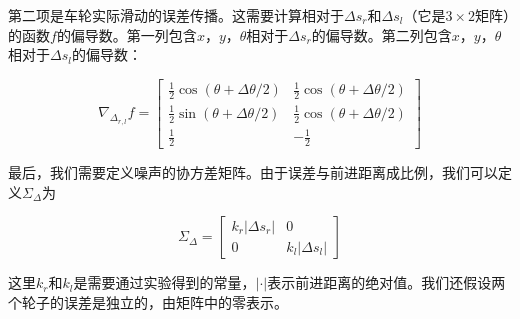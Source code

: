 
第二项是车轮实际滑动的误差传播。这需要计算相对于$\Delta s_r$和$\Delta s_l$（它是$3\times 2$矩阵）的函数$f$的偏导数。第一列包含$x$，$y$，$\theta$相对于$\Delta s_r$的偏导数。第二列包含$x$，$y$，$\theta$相对于$\Delta s_l$的偏导数：

\begin{equation}
\nabla_{\Delta_{r,l}} f=\left[
\begin{array}{cc}
\frac{1}{2}\cos(\theta+\Delta \theta/2) & \frac{1}{2}\cos(\theta+\Delta \theta/2)\\
\frac{1}{2}\sin(\theta+\Delta \theta/2) & \frac{1}{2}\cos(\theta+\Delta \theta/2)\\
\frac{1}{2} & -\frac{1}{2}
\end{array}
\right]
\end{equation}


最后，我们需要定义噪声的协方差矩阵。由于误差与前进距离成比例，我们可以定义$\Sigma_{\Delta}$为

\begin{equation}
\Sigma_{\Delta}=\left[\begin{array}{cc}k_r|\Delta s_r| & 0\\0 & k_l|\Delta s_l|\end{array}\right]
\end{equation}


这里$k_r$和$k_l$是需要通过实验得到的常量，$|\cdot|$表示前进距离的绝对值。我们还假设两个轮子的误差是独立的，由矩阵中的零表示。


